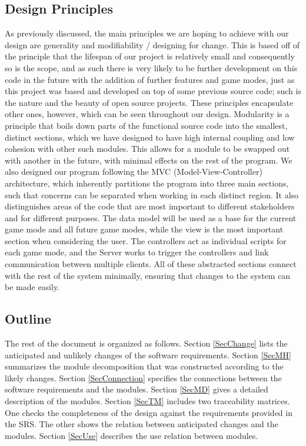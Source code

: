 \documentclass[12pt, titlepage]{article}
\begin{document}
\subsection{Design Principles}

As previously discussed, the main principles we are hoping to achieve with our design are generality and modifiability / designing for change. This is based off of the principle that the lifespan of our project is relatively small and consequently so is the scope, and as such there is very likely to be further development on this code in the future with the addition of further features and game modes, just as this project was based and developed on top of some previous source code; such is the nature and the beauty of open source projects. These principles encapsulate other ones, however, which can be seen throughout our design. Modularity is a principle that boils down parts of the functional source code into the smallest, distinct sections, which we have designed to have high internal coupling and low cohesion with other such modules. This allows for a module to be swapped out with another in the future, with minimal effects on the rest of the program. We also designed our program following the MVC (Model-View-Controller) architecture, which inherently partitions the program into three main sections, such that concerns can be separated when working in each distinct region. It also distinguishes areas of the code that are most important to different stakeholders and for different purposes. The data model will be used as a base for the current game mode and all future game modes, while the view is the most important section when considering the user. The controllers act as individual scripts for each game mode, and the Server works to trigger the controllers and link communication between multiple clients. All of these abstracted sections connect with the rest of the system minimally, ensuring that changes to the system can be made easily.

\subsection{Outline}

The rest of the document is organized as follows. Section
\ref{SecChange} lists the anticipated and unlikely changes of the software
requirements. Section \ref{SecMH} summarizes the module decomposition that
was constructed according to the likely changes. Section \ref{SecConnection}
specifies the connections between the software requirements and the
modules. Section \ref{SecMD} gives a detailed description of the
modules. Section \ref{SecTM} includes two traceability matrices. One checks
the completeness of the design against the requirements provided in the SRS. The
other shows the relation between anticipated changes and the modules. Section
\ref{SecUse} describes the use relation between modules.
\end{document}
